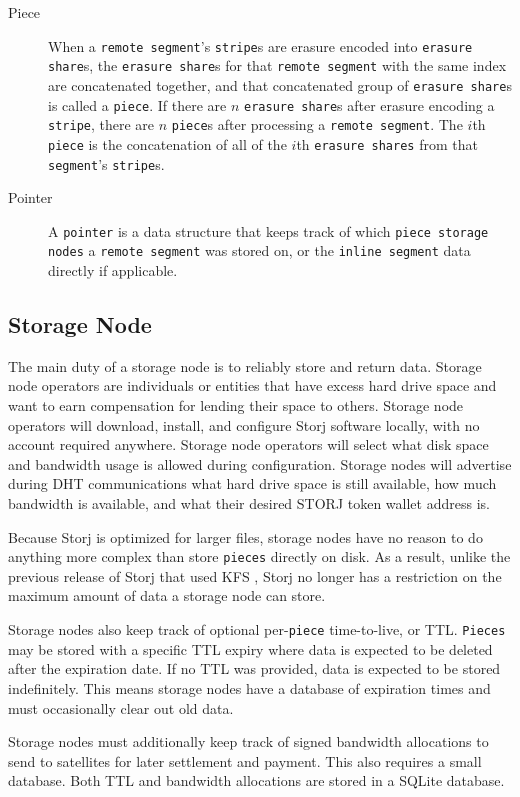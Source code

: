 \documentclass[a4paper,10pt]{article} \usepackage[utf8]{inputenc}
\newcommand{\x}[1]{{\tt #1}} \newcommand{\code}[1]{{\tt #1}}
\begin{document}
\begin{description}
\item[Piece] When a \x{remote segment}'s \x{stripe}s are erasure encoded into
\x{erasure share}s, the \x{erasure share}s for that \x{remote segment} with the
same index are concatenated together, and that concatenated group of \x{erasure
share}s is called a \x{piece}. If there are $n$ \x{erasure share}s after erasure
encoding a \x{stripe}, there are $n$ \x{piece}s after processing a \x{remote
segment}. The $i$th \x{piece} is the concatenation of all of the $i$th
\x{erasure shares} from that \x{segment}'s \x{stripe}s.

\item[Pointer] A \x{pointer} is a data structure that keeps track of which
\x{piece storage nodes} a \x{remote segment} was stored on, or the \x{inline
segment} data directly if applicable.
\end{description}

\subsection{Storage Node}

The main duty of a storage node is to reliably store and return data.
Storage node operators
are individuals or entities that have excess hard drive space and want to earn
compensation for lending their space to others. Storage node operators will
download,
install, and configure Storj software locally, with no account required
anywhere. Storage node operators will select what disk space and bandwidth usage
is allowed during configuration.
Storage nodes will advertise during DHT communications what hard drive space is
still
available, how much bandwidth is available, and what their desired STORJ token
wallet address is.

Because Storj is optimized for larger files, storage nodes have no reason to do
anything more complex than store \x{pieces} directly on disk. As a result,
unlike the previous release of Storj that used KFS \cite{storj-v2}, Storj no
longer has a restriction on the maximum amount of data a storage node can store.

Storage nodes also keep track of optional per-\x{piece} time-to-live, or TTL.
\x{Pieces} may be stored with a specific TTL expiry where data is expected to
be deleted after the expiration date. If no TTL was provided, data is expected
to be stored indefinitely. This means storage nodes have a database of
expiration
times and must occasionally clear out old data.

Storage nodes must additionally keep track of signed bandwidth allocations to
send to
satellites for later settlement and payment. This also requires a small
database. Both TTL and bandwidth allocations are stored in a SQLite
\cite{sqlite} database.
\end{document}
